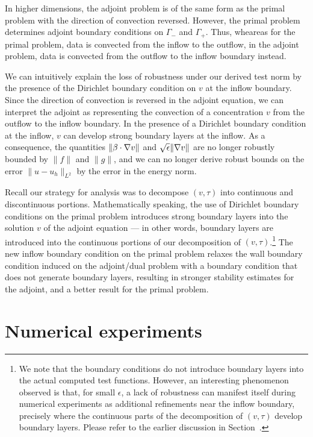 In higher dimensions, the adjoint problem is of the same form as the primal problem with the direction of convection reversed. However, the primal problem determines adjoint boundary conditions on $\Gamma_-$ and $\Gamma_+$. Thus, wheareas for the primal problem, data is convected from the inflow to the outflow, in the adjoint problem, data is convected from the outflow to the inflow boundary instead. 

We can intuitively explain the loss of robustness under our derived test norm by the presence of the Dirichlet boundary condition on $v$ at the inflow boundary. Since the direction of convection is reversed in the adjoint equation, we can interpret the adjoint as representing the convection of a concentration $v$ from the outflow to the inflow boundary. In the presence of a Dirichlet boundary condition at the inflow, $v$ can develop strong boundary layers at the inflow. As a consequence, the quantities $\|\beta\cdot \grad v\|$ and $\sqrt{\epsilon}\|\grad v\|$ are no longer robustly bounded by $\|f\|$ and $\|g\|$, and we can no longer derive robust bounds on the error $\|u-u_h\|_{L^2}$ by the error in the energy norm.

Recall our strategy for analysis was to decompose $(v,\tau)$ into continuous and discontinuous portions. Mathematically speaking, the use of Dirichlet boundary conditions on the primal problem introduces strong boundary layers into the solution $v$ of the adjoint equation --- in other words, boundary layers are introduced into the continuous portions of our decomposition of $(v,\tau)$.\footnote{We note that the boundary conditions do not introduce boundary layers into the actual computed test functions. However, an interesting phenomenon observed is that, for small $\epsilon$, a lack of robustness can manifest itself during numerical experiments as additional refinements near the inflow boundary, precisely where the continuous parts of the decomposition of $(v,\tau)$ develop boundary layers.  Please refer to the earlier discussion in Section~.} The new inflow boundary condition on the primal problem relaxes the wall boundary condition induced on the adjoint/dual problem with a boundary condition that does not generate boundary layers, resulting in stronger stability estimates for the adjoint, and a better result for the primal problem. 

\section{Numerical experiments}
\label{sec:num_exp}

